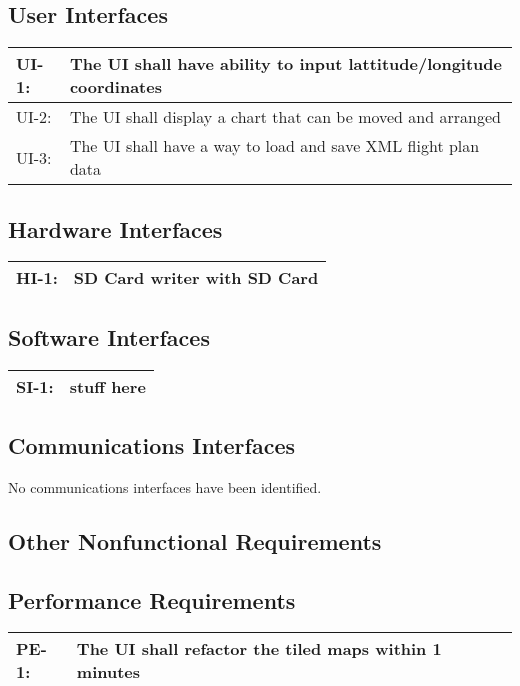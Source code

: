 \documentclass[12pt, letterpaper]{article}
\begin{document}
  \subsection{User Interfaces}
    \begin{tabularx}{\textwidth}{|l|X|}
      \hline
      UI-1: & The UI shall have ability to input lattitude/longitude coordinates\\ \hline
      UI-2: & The UI shall display a chart that can be moved and arranged\\ \hline
      UI-3: & The UI shall have a way to load and save XML flight plan data\\ \hline
    \end{tabularx}
  \subsection{Hardware Interfaces}
    \begin{tabularx}{\textwidth}{|l|X|}
      \hline
      HI-1: & SD Card writer with SD Card\\
      \hline
    \end{tabularx}

  \subsection{Software Interfaces}
    \begin{tabularx}{\textwidth}{|l|X|}
      \hline
      SI-1: & stuff here \\
      \hline
    \end{tabularx}

  \subsection{Communications Interfaces}
  No communications interfaces have been identified.

\subsection{Other Nonfunctional Requirements}
  \subsection{Performance Requirements}
    \begin{tabularx}{\textwidth}{|l|X|}
      \hline
      PE-1: & The UI shall refactor the tiled maps within 1 minutes\\ \hline
    \end{tabularx}
\end{document}

